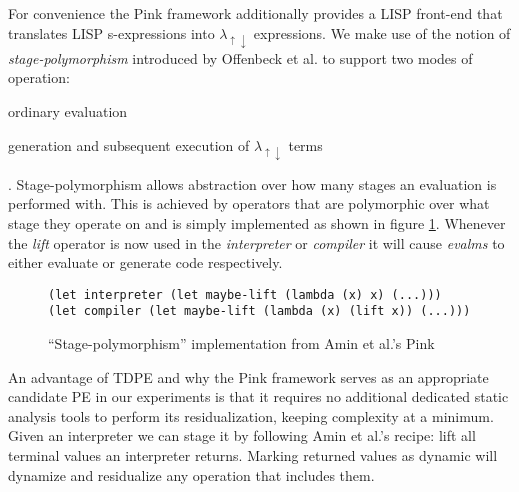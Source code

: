 \documentclass[a4paper,12pt,twoside,openright]{report}
\theoremstyle{definition}
\newcommand{\mslang}{$\lambda_{\uparrow\downarrow}$}
\begin{document}
For convenience the Pink framework additionally provides a LISP front-end that translates LISP s-expressions into \mslang{} expressions. We make use of the notion of \textit{stage-polymorphism} introduced by Offenbeck et al. \cite{ofenbeck2017staging} to support two modes of operation:
\begin{enumerate*}[label=(\arabic*)]
	\item ordinary evaluation
	\item generation and subsequent execution of \mslang{} terms
\end{enumerate*}.
Stage-polymorphism allows abstraction over how many stages an evaluation is performed with. This is achieved by operators that are polymorphic over what stage they operate on and is simply implemented as shown in figure \ref{lst:stage_poly_ex}. Whenever the \textit{lift} operator is now used in the \textit{interpreter} or \textit{compiler} it will cause \textit{evalms} to either evaluate or generate code respectively.

\begin{figure}[ht]
\centering
\begin{verbatim}
(let interpreter (let maybe-lift (lambda (x) x) (...)))
(let compiler (let maybe-lift (lambda (x) (lift x)) (...)))
\end{verbatim}
\caption{``Stage-polymorphism'' implementation from Amin et al.'s Pink \cite{amin2017collapsing}}
\label{lst:stage_poly_ex}
\end{figure}

An advantage of TDPE and why the Pink framework serves as an appropriate candidate PE in our experiments is that it requires no additional dedicated static analysis tools to perform its residualization, keeping complexity at a minimum. Given an interpreter we can stage it by following Amin et al.'s \cite{amin2017collapsing} recipe: lift all terminal values an interpreter returns. Marking returned values as dynamic will dynamize and residualize any operation that includes them.

\end{document}
